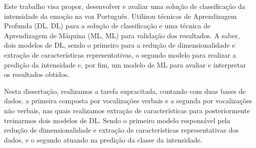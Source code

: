 
Este trabalho visa propor, desenvolver e avaliar uma solução de classificação da intensidade da emoção na voz Português. Utilizou técnicas de Aprendizagem Profunda (\acrlong{DL}, \acrshort{DL}) para a solução de classificação e uma técnica de Aprendizagem de Máquina (\acrlong{ML}, \acrshort{ML}) para validação dos resultados. A saber, dois modelos de \acrlong{DL}, sendo o primeiro para a redução de dimensionalidade e extração de características representativas, o segundo modelo para realizar a predição da intensidade e, por fim, um modelo de \acrlong{ML} para avaliar e interpretar os resultados obtidos.

Nesta dissertação, realizamos a tarefa supracitada, contando com duas bases de dados, a primeira composta por vocalizações verbais e a segunda por vocalizações não verbais, nas quais realizamos extração de características para posteriormente treinarmos dois modelos de \acrshort{DL}. Sendo o primeiro modelo responsável pela redução de dimensionalidade e extração de características representativas dos dados, e o segundo atuando na predição da classe da intensidade.




